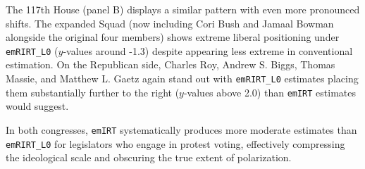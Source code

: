 \documentclass[11pt]{article}
\begin{document}
The 117th House (panel B) displays a similar pattern with even more pronounced shifts. The expanded Squad (now including Cori Bush and Jamaal Bowman alongside the original four members) shows extreme liberal positioning under \texttt{emRIRT\_L0} ($y$-values around -1.3) despite appearing less extreme in conventional estimation. On the Republican side, Charles Roy, Andrew S. Biggs, Thomas Massie, and Matthew L. Gaetz again stand out with \texttt{emRIRT\_L0} estimates placing them substantially further to the right ($y$-values above 2.0) than \texttt{emIRT} estimates would suggest.

In both congresses, \texttt{emIRT} systematically produces more moderate estimates than \texttt{emRIRT\_L0} for legislators who engage in protest voting, effectively compressing the ideological scale and obscuring the true extent of polarization. %
\end{document}
